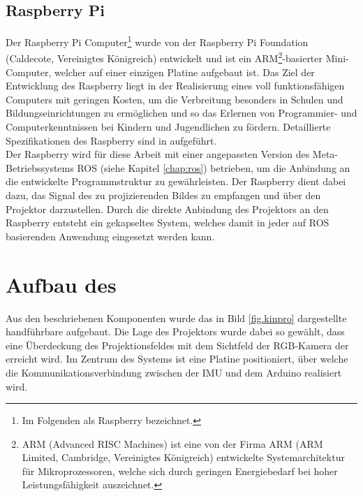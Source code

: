 
\subsection{Raspberry Pi\textsuperscript{\texttrademark}}
Der Raspberry Pi\textsuperscript{\texttrademark} Computer\footnote{Im Folgenden als Raspberry bezeichnet.} wurde von der Raspberry Pi Foundation (Caldecote, Vereinigtes Königreich) entwickelt und ist ein ARM\footnote{ARM (Advanced RISC Machines) ist eine von der Firma ARM (ARM Limited, Cambridge, Vereinigtes Königreich) entwickelte Systemarchitektur für Mikroprozessoren, welche sich durch geringen Energiebedarf bei hoher Leistungsfähigkeit auszeichnet.}-basierter Mini-Computer, welcher auf einer einzigen Platine aufgebaut ist. Das Ziel der Entwicklung des Raspberry liegt in der Realisierung eines voll funktionsfähigen Computers mit geringen Kosten, um die Verbreitung besonders in Schulen und Bildungseinrichtungen zu ermöglichen und so das Erlernen von Programmier- und Computerkenntnissen bei Kindern und Jugendlichen zu fördern. Detaillierte Spezifikationen des Raspberry sind in  aufgeführt.\\

Der Raspberry wird für diese Arbeit mit einer angepassten Version des Meta-Betriebssystems ROS (siehe Kapitel \ref{chap:ros}) betrieben, um die Anbindung an die entwickelte Programmstruktur zu gewährleisten. Der Raspberry dient dabei dazu, das Signal des zu projizierenden Bildes zu empfangen und über den Projektor darzustellen. Durch die direkte Anbindung des Projektors an den Raspberry entsteht ein gekapseltes System, welches damit in jeder auf ROS basierenden Anwendung eingesetzt werden kann.


\section{Aufbau des }
Aus den beschriebenen Komponenten wurde das in Bild \ref{fig.kinpro} dargestellte handführbare \kps{} aufgebaut. Die Lage des Projektors wurde dabei so gewählt, dass eine Überdeckung des Projektionsfeldes mit dem Sichtfeld der RGB-Kamera der \kin erreicht wird. Im Zentrum des Systems ist eine Platine positioniert, über welche die Kommunikationsverbindung zwischen der IMU und dem Arduino realisiert wird.\\

